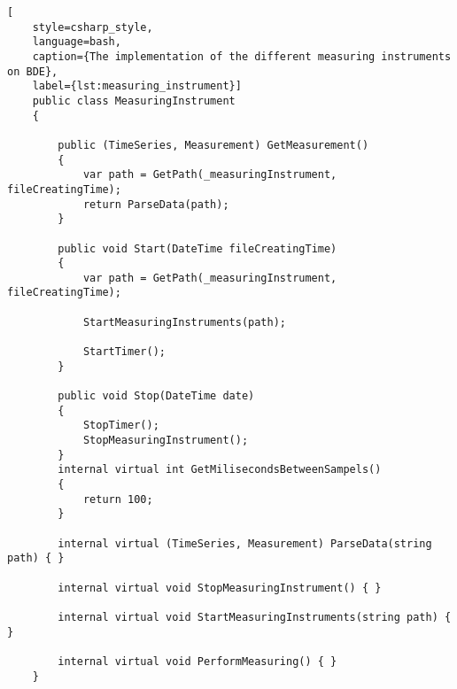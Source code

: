 
\begin{lstlisting}[
    style=csharp_style,
    language=bash, 
    caption={The implementation of the different measuring instruments on BDE},
    label={lst:measuring_instrument}]
    public class MeasuringInstrument
    {
        
        public (TimeSeries, Measurement) GetMeasurement()
        {
            var path = GetPath(_measuringInstrument, fileCreatingTime);
            return ParseData(path);
        }

        public void Start(DateTime fileCreatingTime)
        {
            var path = GetPath(_measuringInstrument, fileCreatingTime);

            StartMeasuringInstruments(path);

            StartTimer();
        }
            
        public void Stop(DateTime date)
        {
            StopTimer();
            StopMeasuringInstrument();
        }
        internal virtual int GetMilisecondsBetweenSampels()
        {
            return 100;
        }
                
        internal virtual (TimeSeries, Measurement) ParseData(string path) { }

        internal virtual void StopMeasuringInstrument() { }

        internal virtual void StartMeasuringInstruments(string path) { }

        internal virtual void PerformMeasuring() { }
    }
\end{lstlisting}